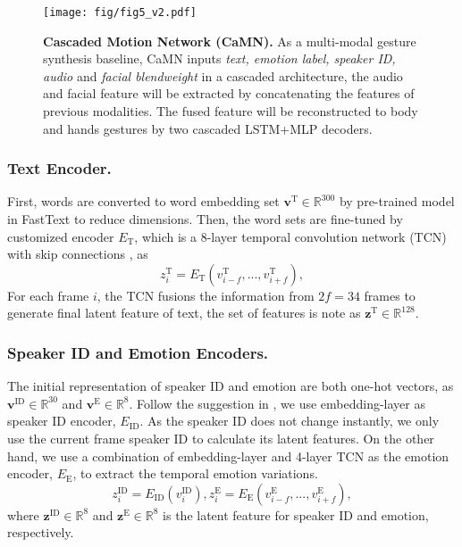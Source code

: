 \documentclass[runningheads]{llncs}
\begin{document}
\begin{figure*}[]
\begin{center}
\texttt{[image: fig/fig5\_v2.pdf]}
\end{center}
\vspace{-0.5cm}
\caption{
\textbf{ Cascaded Motion Network (CaMN).} As a multi-modal gesture synthesis baseline, CaMN inputs \textit{text, emotion label, speaker ID, audio} and \textit{facial blendweight} in a cascaded architecture, the audio and facial feature will be extracted by concatenating the features of previous modalities. The fused feature will be reconstructed to body and hands gestures by two cascaded LSTM+MLP decoders.
}
\vspace{-0.5cm}
\label{fig:fig5}
\end{figure*} 
\vspace{-0.5cm}

\subsubsection{Text Encoder.} First, words are converted to word embedding set $\textbf{v}^\text{T} \in \mathbb{R}^{300} $ by pre-trained model in FastText \cite{bojanowski2017enriching} to reduce dimensions. Then, the word sets are fine-tuned by customized encoder $E_\text{T}$, which is a 8-layer temporal convolution network (TCN) \cite{bai2018empirical} with skip connections \cite{he2016deep}, as 
\begin{equation}
    z^\text{T}_{i} = E_\text{T}(v^\text{T}_{i-f}, ..., v^\text{T}_{i+f}), 
    \label{eq1}
\end{equation}
For each frame $i$, the TCN fusions the information from $2f=34$ frames to generate final latent feature of text, the set of features is note as $\textbf{z}^\text{T} \in \mathbb{R}^{128} $. 



\vspace{-0.5cm}
\subsubsection{Speaker ID and Emotion Encoders.} The initial representation of speaker ID and emotion are both one-hot vectors, as $\textbf{v}^\text{ID} \in \mathbb{R}^{30}$ and  $\textbf{v}^\text{E} \in \mathbb{R}^{8}$. Follow the suggestion in \cite{yoon2020speech}, we use embedding-layer as speaker ID encoder, $E_\text{ID}$. As the speaker ID does not change instantly, we only use the current frame speaker ID to calculate its latent features. On the other hand, we use a combination of embedding-layer and 4-layer TCN as the emotion encoder, $E_\text{E}$, to extract the temporal emotion variations. 
\begin{equation}
    z^\text{ID}_{i} = E_\text{ID}(v^\text{ID}_{i}), z^\text{E}_{i} = E_\text{E}(v^\text{E}_{i-f}, ..., v^\text{E}_{i+f}), 
    \label{eq2}
\end{equation}
where $\textbf{z}^\text{ID} \in \mathbb{R}^{8}$ and  $\textbf{z}^\text{E} \in \mathbb{R}^{8} $ is the latent feature for speaker ID and emotion, respectively. 
\end{document}

